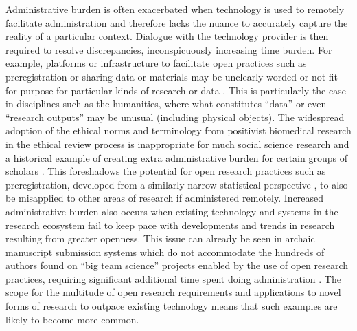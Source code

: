 \documentclass[meta, authordate]{jote-new-article}
\begin{document}
Administrative burden is often exacerbated when technology is used to remotely facilitate administration and therefore lacks the nuance to accurately capture the reality of a particular context. Dialogue with the technology provider is then required to resolve discrepancies, inconspicuously increasing time burden. For example, platforms or infrastructure to facilitate open practices such as preregistration or sharing data or materials may be unclearly worded or not fit for purpose for particular kinds of research or data \parencites[e.g.][]{Borgerud2020}{Rhys Evans2021}. This is particularly the case in disciplines such as the humanities, where what constitutes “data” or even “research outputs” may be unusual (including physical objects). The widespread adoption of the ethical norms and terminology from positivist biomedical research in the ethical review process is inappropriate for much social science research and a historical example of creating extra administrative burden for certain groups of scholars \parencites{Schneider2015}. This foreshadows the potential for open research practices such as preregistration, developed from a similarly narrow statistical perspective \parencites{Nosek2018}, to also be misapplied to other areas of research if administered remotely. Increased administrative burden also occurs when existing technology and systems in the research ecosystem fail to keep pace with developments and trends in research resulting from greater openness. This issue can already be seen in archaic manuscript submission systems which do not accommodate the hundreds of authors found on “big team science” projects enabled by the use of open research practices, requiring significant additional time spent doing administration \parencites{Forscher2022}. The scope for the multitude of open research requirements and applications to novel forms of research to outpace existing technology means that such examples are likely to become more common.
\end{document}
